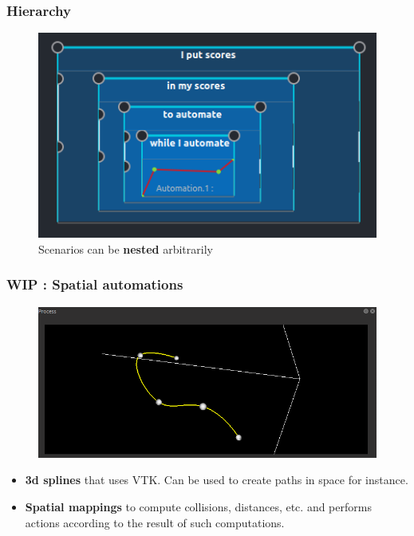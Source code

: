 \documentclass{beamer}
\begin{document}
    \begin{frame}
        \frametitle{Hierarchy}
        
        \begin{figure}
        	\centering
        	\includegraphics[scale=0.6]{images/hierarchy.png}
        	\caption{Scenarios can be \textbf{nested} arbitrarily}
        \end{figure}   
    \end{frame}
    
    \begin{frame}
        \frametitle{WIP : Spatial automations}
        
        \begin{figure}
        	\centering
        	\includegraphics[width=\textwidth]{images/autom3d.png}
        \end{figure}   
        
        \begin{itemize}
        	\item \textbf{3d splines} that uses VTK. Can be used to create paths in space for instance.
        	\item \textbf{Spatial mappings} to compute collisions, distances, etc. and performs actions according to the result of such computations.
        \end{itemize}
    \end{frame}
    
\end{document}

